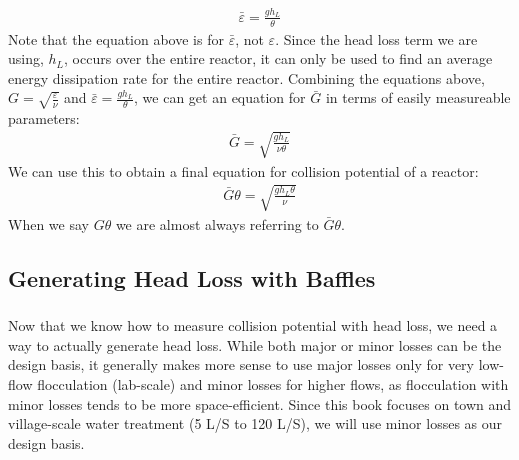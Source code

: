 \documentclass[letterpaper,10pt,english]{sphinxmanual}
\begin{document}
\begin{equation}\label{equation:Flocculation/Floc_Design:Flocculation/Floc_Design:4}
\begin{split}\bar \varepsilon = \frac{g h_L}{\theta}\end{split}
\end{equation}
Note that the equation above is for \(\bar \varepsilon\), not \(\varepsilon\). Since the head loss term we are using, \(h_L\), occurs over the entire reactor, it can only be used to find an average energy dissipation rate for the entire reactor. Combining the equations above, \(G = \sqrt{\frac{\varepsilon}{\nu}}\) and \(\bar \varepsilon = \frac{g h_L}{\theta}\), we can get an equation for \(\bar G\) in terms of easily measureable parameters:
\begin{equation}\label{equation:Flocculation/Floc_Design:Flocculation/Floc_Design:5}
\begin{split}\bar G = \sqrt{\frac{g h_L}{\nu \theta}}\end{split}
\end{equation}
We can use this to obtain a final equation for collision potential of a reactor:
\begin{equation}\label{equation:Flocculation/Floc_Design:Flocculation/Floc_Design:6}
\begin{split}\bar G \theta = \sqrt{\frac{g h_L \theta}{\nu}}\end{split}
\end{equation}
 When we say \(G \theta\) we are almost always referring to \(\bar G \theta\).


\subsection{Generating Head Loss with Baffles}
\label{\detokenize{Flocculation/Floc_Design:generating-head-loss-with-baffles}}

\subsubsection{}
\label{\detokenize{Flocculation/Floc_Design:what-are-baffles}}
Now that we know how to measure collision potential with head loss, we need a way to actually generate head loss. While both major or minor losses can be the design basis, it generally makes more sense to use major losses only for very low-flow flocculation (lab-scale) and minor losses for higher flows, as flocculation with minor losses tends to be more space-efficient. Since this book focuses on town and village-scale water treatment (5 L/S to 120 L/S), we will use minor losses as our design basis.
\end{document}
